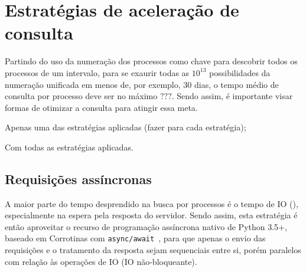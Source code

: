 \section{Estratégias de aceleração de consulta}

Partindo do uso da numeração dos processos como chave para descobrir todos os
processos de um intervalo, para se exaurir todas as $10^{13}$ possibilidades da
numeração unificada em menos de, por exemplo, 30 dias, o tempo médio de
consulta por processo deve ser no máximo $???$. Sendo assim, é importante visar
formas de otimizar a consulta para atingir essa meta.


\begin{todolist}
    \item Apenas uma das estratégias aplicadas (fazer para cada estratégia);
    \item Com todas as estratégias aplicadas.
\end{todolist}

\subsection{Requisições assíncronas}

A maior parte do tempo desprendido na busca por processos é o tempo de IO
(), especialmente na espera pela resposta do
servidor. Sendo assim, esta estratégia é então aproveitar o recurso de
programação assíncrona nativo de Python 3.5+, baseado em Corrotinas com
\texttt{async/await}~\cite{spec:pep0492}, para que apenas o envio das
requisições e o tratamento da resposta sejam sequenciais entre si, porém
paralelos com relação às operações de IO (IO não-bloqueante).

